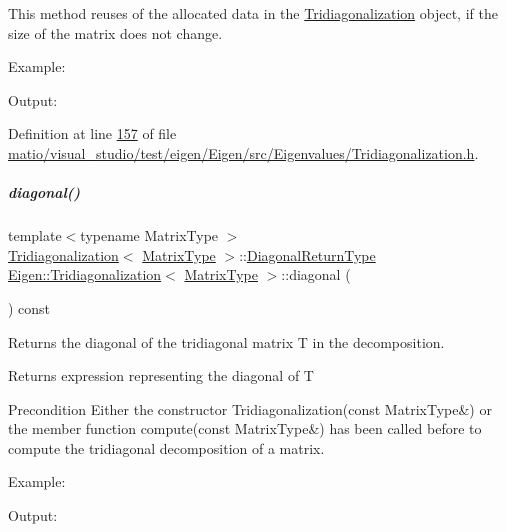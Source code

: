 This method reuses of the allocated data in the \hyperlink{group___eigenvalues___module_class_eigen_1_1_tridiagonalization}{Tridiagonalization} object, if the size of the matrix does not change.

Example\+: 
\begin{DoxyCodeInclude}
\end{DoxyCodeInclude}
 Output\+: 
\begin{DoxyVerbInclude}
\end{DoxyVerbInclude}
 

Definition at line \hyperlink{matio_2visual__studio_2test_2eigen_2_eigen_2src_2_eigenvalues_2_tridiagonalization_8h_source_l00157}{157} of file \hyperlink{matio_2visual__studio_2test_2eigen_2_eigen_2src_2_eigenvalues_2_tridiagonalization_8h_source}{matio/visual\+\_\+studio/test/eigen/\+Eigen/src/\+Eigenvalues/\+Tridiagonalization.\+h}.

\mbox{\label{group___eigenvalues___module_a0b7ff4860aa6f7c0761b1059c012fd8e}} 
\subparagraph{\texorpdfstring{diagonal()}{diagonal()}\hspace{0.1cm}{\footnotesize\ttfamily [1/2]}}
{\footnotesize\ttfamily template$<$typename Matrix\+Type $>$ \\
\hyperlink{group___eigenvalues___module_class_eigen_1_1_tridiagonalization}{Tridiagonalization}$<$ \hyperlink{group___eigenvalues___module_add0f4b2216d0ea8ee0f7d8525deaf0a9}{Matrix\+Type} $>$\+::\hyperlink{class_eigen_1_1internal_1_1_tensor_lazy_evaluator_writable}{Diagonal\+Return\+Type} \hyperlink{group___eigenvalues___module_class_eigen_1_1_tridiagonalization}{Eigen\+::\+Tridiagonalization}$<$ \hyperlink{group___eigenvalues___module_add0f4b2216d0ea8ee0f7d8525deaf0a9}{Matrix\+Type} $>$\+::diagonal (\begin{DoxyParamCaption}{ }\end{DoxyParamCaption}) const}



Returns the diagonal of the tridiagonal matrix T in the decomposition. 

\begin{DoxyReturn}{Returns}
expression representing the diagonal of T
\end{DoxyReturn}
\begin{DoxyPrecond}{Precondition}
Either the constructor Tridiagonalization(const Matrix\+Type\&) or the member function compute(const Matrix\+Type\&) has been called before to compute the tridiagonal decomposition of a matrix.
\end{DoxyPrecond}
Example\+: 
\begin{DoxyCodeInclude}
\end{DoxyCodeInclude}
 Output\+: 
\begin{DoxyVerbInclude}
\end{DoxyVerbInclude}


